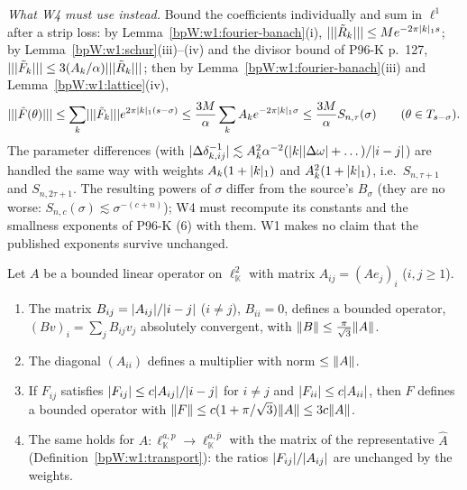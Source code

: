 \begin{remark}
\emph{What W4 must use instead.} Bound the coefficients individually and sum in $\ell^1$ after a strip loss:
by Lemma~\ref{bpW:w1:fourier-banach}(i), $\lvert \lvert \lvert \tilde R_k\rvert\rvert\rvert\le Me^{-2\pi\lvert k\rvert_1s}$; by
Lemma~\ref{bpW:w1:schur}(iii)--(iv) and the divisor bound of P96-K p.~127,
$\lvert \lvert \lvert \tilde F_k\rvert\rvert\rvert\le3(A_k/\alpha)\lvert \lvert \lvert \tilde R_k\rvert\rvert\rvert$; then by
Lemma~\ref{bpW:w1:fourier-banach}(iii) and Lemma~\ref{bpW:w1:lattice}(iv),
\[\lvert \lvert \lvert \tilde F(\theta)\rvert\rvert\rvert\le\sum_k\lvert \lvert \lvert \tilde F_k\rvert\rvert\rvert e^{2\pi\lvert k\rvert_1(s-\sigma)}\le\frac{3M}\alpha
\sum_kA_ke^{-2\pi\lvert k\rvert_1\sigma}\le\frac{3M}\alpha S_{n,\tau}(\sigma)\qquad(\theta\in T_{s-\sigma}).\]
The parameter differences (with $\lvert \Delta\delta_{k,ij}^{-1}\rvert\lesssim A_k^2\alpha^{-2}(\lvert k\rvert\lvert \Delta\omega\rvert+\dots)/\lvert i-j\rvert$)
are handled the same way with weights $A_k(1+\lvert k\rvert_1)$ and $A_k^2(1+\lvert k\rvert_1)$, i.e.\ $S_{n,\tau+1}$ and
$S_{n,2\tau+1}$. The resulting powers of $\sigma$ differ from the source's $B_\sigma$ (they are no worse:
$S_{n,c}(\sigma)\lesssim\sigma^{-(c+n)}$); W4 must recompute its constants and the smallness exponents of P96-K (6)
with them. W1 makes no claim that the published exponents survive unchanged.
\end{remark}

\begin{lemma}\label{bpW:w1:schur}
Let $A$ be a bounded linear operator on $\ell^2_{\mathbb K}$ with matrix $A_{ij}=(Ae_j)_i$ ($i,j\ge1$).
\begin{enumerate}[label=(\roman*)]
\item The matrix $B_{ij}=\lvert A_{ij}\rvert/\lvert i-j\rvert$ ($i\ne j$), $B_{ii}=0$, defines a bounded operator,
  $(Bv)_i=\sum_jB_{ij}v_j$ absolutely convergent, with $\lVert B\rVert\le\frac\pi{\sqrt3}\lVert A\rVert$.
\item The diagonal $(A_{ii})$ defines a multiplier with norm $\le\lVert A\rVert$.
\item If $F_{ij}$ satisfies $\lvert F_{ij}\rvert\le c\lvert A_{ij}\rvert/\lvert i-j\rvert$ for $i\ne j$ and $\lvert F_{ii}\rvert\le c\lvert A_{ii}\rvert$,
  then $F$ defines a bounded operator with $\lVert F\rVert\le c(1+\pi/\sqrt3)\lVert A\rVert\le3c\lVert A\rVert$.
\item The same holds for $A:\ell^{a,p}_{\mathbb K}\to\ell^{a,\bar p}_{\mathbb K}$ with the matrix of the representative
  $\hat A$ (Definition~\ref{bpW:w1:transport}): the ratios $\lvert F_{ij}\rvert/\lvert A_{ij}\rvert$ are unchanged by the weights.
\end{enumerate}
\end{lemma}


